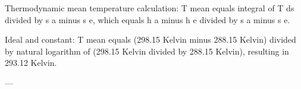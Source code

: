 Thermodynamic mean temperature calculation:  
T mean equals integral of T ds divided by s a minus s e, which equals h a minus h e divided by s a minus s e.  

Ideal and constant:  
T mean equals (298.15 Kelvin minus 288.15 Kelvin) divided by natural logarithm of (298.15 Kelvin divided by 288.15 Kelvin), resulting in 293.12 Kelvin.  

---